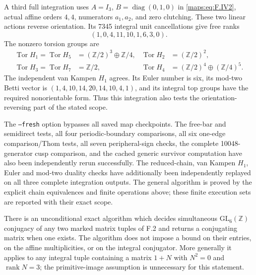 A third full integration uses
$A=I_3$, $B=\operatorname{diag}(0,1,0)$ in \eqref{maps:eq:F.IV2},
actual affine orders $4,4$, numerators $a_1,a_2$, and zero
clutching.  These two linear actions reverse orientation.
Its 7345 integral unit cancellations give free ranks
\[
                  (1,0,4,11,10,1,6,3,0).
\]
The nonzero torsion groups are
\[
\begin{aligned}
 \operatorname{Tor}H_1=\operatorname{Tor}H_5
       &=(\mathbb Z/2)^3\oplus\mathbb Z/4,&
 \operatorname{Tor}H_2&=(\mathbb Z/2)^2,\\
 \operatorname{Tor}H_3=\operatorname{Tor}H_7
       &=\mathbb Z/2,&
 \operatorname{Tor}H_4&=(\mathbb Z/2)^4\oplus(\mathbb Z/4)^5.
\end{aligned}
\]
The independent van Kampen $H_1$ agrees.  Its Euler number
is six, its mod-two Betti vector is
$(1,4,10,14,20,14,10,4,1)$, and its integral top groups
have the required nonorientable form.  Thus this integration
also tests the orientation-reversing part of the stated scope.

The \texttt{--fresh} option bypasses all saved map checkpoints.
The free-bar and semidirect tests, all four periodic-boundary
comparisons, all six one-edge comparison/Thom tests, all seven
peripheral-sign checks, the complete 10048-generator cusp
comparison, and the cached generic survivor computation have
also been independently rerun successfully.  The
reduced-chain, van Kampen $H_1$, Euler and mod-two duality
checks have additionally been independently replayed on
all three complete integration outputs.  The general
algorithm is proved by the explicit chain equivalences and
finite operations above; these finite execution sets are
reported with their exact scope.







\begin{theorem}\label{maps:src:F.2.36}


There is an unconditional exact algorithm which decides simultaneous
$\mathrm{GL}_6(\mathbb Z)$ conjugacy of any two marked matrix tuples of
F.2 and returns a conjugating matrix when one exists. The algorithm
does not impose a bound on their entries, on the affine multiplicities,
or on the integral conjugator. More generally it applies to any integral
tuple containing a matrix $1+N$ with $N^2=0$ and $\operatorname{rank}N=3$;
the primitive-image assumption is unnecessary for this statement.

\end{theorem}


